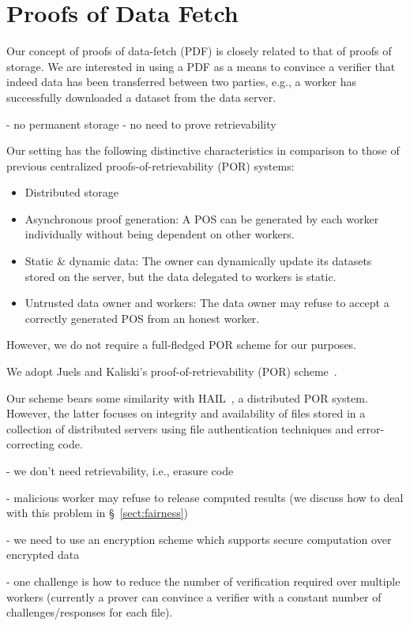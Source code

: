\section{Proofs of Data Fetch} \label{sect:pos}

Our concept of proofs of data-fetch (PDF) is closely related to that of proofs of storage.
We are interested in using a PDF as a means to convince a verifier that indeed data has been transferred between two parties, e.g., a worker has successfully downloaded a dataset from the data server.

- no permanent storage
- no need to prove retrievability

Our setting has the following distinctive characteristics in comparison to those of previous centralized proofs-of-retrievability (POR) systems:
\begin{itemize}
 \item Distributed storage
 \item Asynchronous proof generation: A POS can be generated by each worker individually without being dependent on other workers.
 \item Static \& dynamic data: The owner can dynamically update its datasets stored on the server, but the data delegated to workers is static.
 \item Untrusted data owner and workers: The data owner may refuse to accept a correctly generated POS from an honest worker.
\end{itemize}

However, we do not require a full-fledged POR scheme for our purposes.

We adopt Juels and Kaliski's proof-of-retrievability (POR) scheme~\cite{JK07}.


Our scheme bears some similarity with HAIL~\cite{BJO09b}, a distributed POR system.
However, the latter focuses on integrity and availability of files stored in a collection of distributed servers using file authentication techniques and error-correcting code.

- we don't need retrievability, i.e., erasure code

- malicious worker may refuse to release computed results (we discuss how to deal with this problem in \S~\ref{sect:fairness})

- we need to use an encryption scheme which supports secure computation over encrypted data

- one challenge is how to reduce the number of verification required over multiple workers (currently a prover can convince a verifier with a constant number of challenges/responses for each file). 

